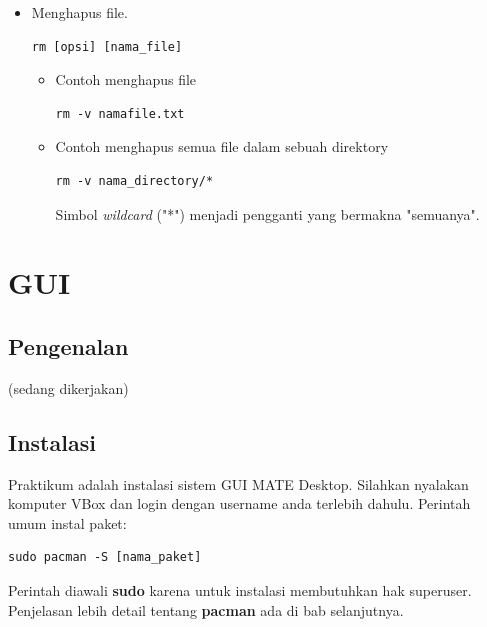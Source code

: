 \documentclass[12pt,]{article}
\begin{document}
\begin{itemize}
		\item Menghapus file.
		\begin{verbatim}
rm [opsi] [nama_file]
		\end{verbatim}
		\begin{itemize}
			\item Contoh menghapus file
			\begin{verbatim}
rm -v namafile.txt
			\end{verbatim}
			
			\item Contoh menghapus semua file dalam sebuah direktory
			\begin{verbatim}
rm -v nama_directory/*
			\end{verbatim}
			Simbol \textit{wildcard} ("*") menjadi pengganti yang bermakna "semuanya".
		\end{itemize}
	\end{itemize}
	
	\newpage
	\section{GUI}
	\subsection{Pengenalan}
	(sedang dikerjakan)
	
	\subsection{Instalasi}
	Praktikum adalah instalasi sistem GUI MATE Desktop.
	Silahkan nyalakan komputer VBox dan login dengan username anda terlebih dahulu.
	Perintah umum instal paket:
	\begin{verbatim}
sudo pacman -S [nama_paket]
	\end{verbatim}
	Perintah diawali \textbf{sudo} karena untuk instalasi membutuhkan hak superuser.
	Penjelasan lebih detail tentang \textbf{pacman} ada di bab selanjutnya.
	
\end{document}
